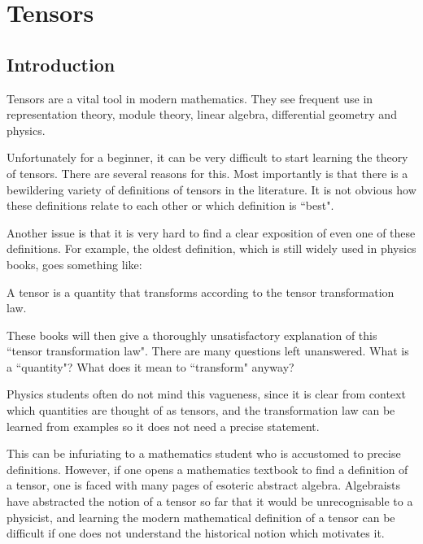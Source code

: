 
\newcommand{\Cliff}{\operatorname{Cliff}}
\newcommand{\Cl}{C\ell}
\newcommand{\com}{\mathrm{com}}
\newcommand{\Hom}{\operatorname{Hom}}
\newcommand{\A}{\mathcal{A}}
\newcommand{\Hilb}{\mathcal{H}}
\newcommand{\D}{\mathcal{D}}
\newcommand{\End}{\operatorname{End}}
\newcommand{\Mult}{\operatorname{Mult}}
\newcommand{\isom}{\cong}

\setlength\parindent{0pt}

%
\section{Tensors} %
\label{sec:tensors}

\subsection{Introduction}
Tensors are a vital tool in modern mathematics. They see
frequent use in representation theory, module theory, linear algebra, differential
geometry and physics.

Unfortunately for a beginner, it can be very difficult to start learning
the theory of tensors. There are several reasons for this.
Most importantly is that there is a bewildering variety of 
definitions of tensors in the literature. It is not obvious
how these definitions relate to each other or which definition is ``best".

Another issue is that it is very hard to find a clear exposition of even one 
of these definitions. For example, the oldest definition, which is still
widely used in physics books, goes something like:
\begin{displayquote}
A tensor is a quantity that transforms according to the tensor 
transformation law.
\end{displayquote}
These books will then give a thoroughly unsatisfactory explanation of this
``tensor transformation law". There are many questions left unanswered.
What is a ``quantity"? What does it mean to ``transform" anyway?

Physics students often do not mind this 
vagueness, since it is clear from context which quantities are thought of as tensors,
and the transformation law can be learned from examples so it does not need a
precise statement.

This can be infuriating to a mathematics student who is accustomed to
precise definitions. However, if one opens a mathematics textbook to find a definition
of a tensor, one is faced with many pages of esoteric abstract algebra. Algebraists
have abstracted the notion of a tensor so far that it would be unrecognisable
to a physicist, and learning the modern mathematical definition of a tensor
can be difficult if one does not understand the historical notion which
motivates it.

